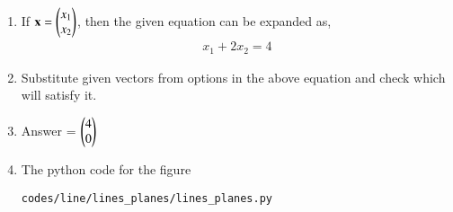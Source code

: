 \renewcommand{\theequation}{\theenumi}
\begin{enumerate}[label=\arabic*.,ref=\thesubsection.\theenumi]
\begin{figure}[!ht]
\centering
\texttt{[image: ./figs/line/lines\_planes/fig.eps]}
\caption{Line equation: y=(x-4)/2}
\end{figure}
\item If $\mathbf{x} = \begin{pmatrix}x_1\\x_2\end{pmatrix}$, then the given equation can be expanded as,
\begin{align}
x_1 + 2x_2 = 4
\end{align}
\item Substitute given vectors from options in the above equation and check which will satisfy it.
\item Answer = $\begin{pmatrix}4\\0\end{pmatrix}$
\item The python code for the figure 
\begin{lstlisting}
codes/line/lines_planes/lines_planes.py
\end{lstlisting}
\end{enumerate}